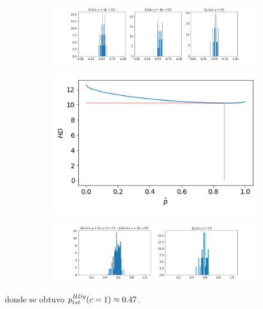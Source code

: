 \begin{figure}[h]
    \centering
    \begin{subfigure}[b]{\textwidth}
        \centering
        \includegraphics[width=\linewidth]{../plots_teoria/hdy_1.png}
    \end{subfigure}
    \begin{subfigure}[b]{0.4\textwidth}
        \centering
        \includegraphics[width=\linewidth]{../plots_teoria/hdy_2.png}
    \end{subfigure}
    \begin{subfigure}[b]{\textwidth}
        \centering
        \includegraphics[width=\linewidth]{../plots_teoria/hdy_3.png}
    \end{subfigure}
    \hfill
\end{figure}

donde se obtuvo $p^{\it{HDy}}_{tst}(c=1) \approx 0.47$.

